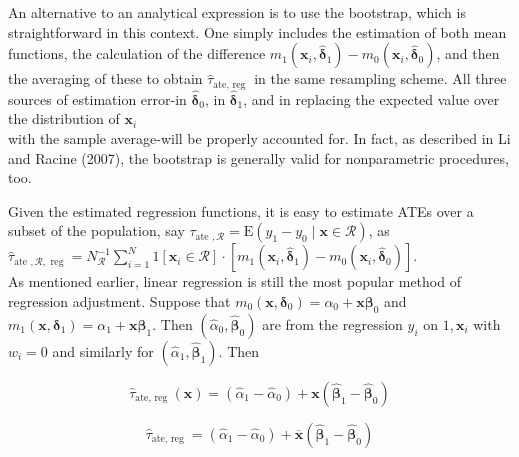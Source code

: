 \documentclass[10pt]{article}
\begin{document}
An alternative to an analytical expression is to use the bootstrap, which is straightforward in this context. One simply includes the estimation of both mean functions, the calculation of the difference $m_{1}\left(\mathbf{x}_{i}, \hat{\boldsymbol{\delta}}_{1}\right)-m_{0}\left(\mathbf{x}_{i}, \hat{\boldsymbol{\delta}}_{0}\right)$, and then the averaging of these to obtain $\hat{\tau}_{\text {ate, reg }}$ in the same resampling scheme. All three sources of estimation error-in $\hat{\boldsymbol{\delta}}_{0}$, in $\hat{\boldsymbol{\delta}}_{1}$, and in replacing the expected value over the distribution of $\mathbf{x}_{i}$\\
with the sample average-will be properly accounted for. In fact, as described in Li and Racine (2007), the bootstrap is generally valid for nonparametric procedures, too.

Given the estimated regression functions, it is easy to estimate ATEs over a subset of the population, say $\tau_{\text {ate }, \mathscr{R}}=\mathrm{E}\left(y_{1}-y_{0} \mid \mathbf{x} \in \mathscr{R}\right)$, as\\
$\hat{\tau}_{\text {ate }, \mathscr{R}, \text { reg }}=N_{\mathscr{R}}^{-1} \sum_{i=1}^{N} 1\left[\mathbf{x}_{i} \in \mathscr{R}\right] \cdot\left[m_{1}\left(\mathbf{x}_{i}, \hat{\boldsymbol{\delta}}_{1}\right)-m_{0}\left(\mathbf{x}_{i}, \hat{\boldsymbol{\delta}}_{0}\right)\right]$.\\
As mentioned earlier, linear regression is still the most popular method of regression adjustment. Suppose that $m_{0}\left(\mathbf{x}, \boldsymbol{\delta}_{0}\right)=\alpha_{0}+\mathbf{x} \boldsymbol{\beta}_{0}$ and $m_{1}\left(\mathbf{x}, \boldsymbol{\delta}_{1}\right)=\alpha_{1}+\mathbf{x} \boldsymbol{\beta}_{1}$. Then $\left(\hat{\alpha}_{0}, \hat{\boldsymbol{\beta}}_{0}\right)$ are from the regression $y_{i}$ on $1, \mathbf{x}_{i}$ with $w_{i}=0$ and similarly for $\left(\hat{\alpha}_{1}, \hat{\boldsymbol{\beta}}_{1}\right)$. Then


\begin{equation*}
\hat{\tau}_{\text {ate, reg }}(\mathbf{x})=\left(\hat{\alpha}_{1}-\hat{\alpha}_{0}\right)+\mathbf{x}\left(\hat{\boldsymbol{\beta}}_{1}-\hat{\boldsymbol{\beta}}_{0}\right) \tag{21.32}
\end{equation*}



\begin{equation*}
\hat{\tau}_{\text {ate, reg }}=\left(\hat{\alpha}_{1}-\hat{\alpha}_{0}\right)+\overline{\mathbf{x}}\left(\hat{\boldsymbol{\beta}}_{1}-\hat{\boldsymbol{\beta}}_{0}\right) \tag{21.33}
\end{equation*}
\end{document}
